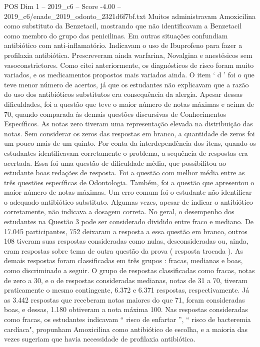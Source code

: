 \begin{textsample}{POS Dim 1 – 2019\_c6 – Score -4.00 – 2019\_c6/enade\_2019\_odonto\_2321d6f7bf.txt}
Muitos administravam Amoxicilina como substituto da Benzetacil, mostrando que não identificavam a Benzetacil como membro do grupo das penicilinas.
Em outras situações confundiam antibiótico com anti-inflamatório.
Indicavam o uso de Ibuprofeno para fazer a profilaxia antibiótica.
Prescreveram ainda warfarina, Novalgina e anestésicos sem vasoconstrictores.
Como citei anteriormente, os diagnósticos de risco foram muito variados, e os medicamentos propostos mais variados ainda.
O item ‘ d ’ foi o que teve menor número de acertos, já que os estudantes não explicavam que a razão do uso dos antibióticos substitutos era consequência da alergia.
Apesar dessas dificuldades, foi a questão que teve o maior número de notas máximas e acima de 70, quando comparada às demais questões discursivas de Conhecimentos Específicos.
As notas zero tiveram uma representação elevada na distribuição das notas.
Sem considerar os zeros das respostas em branco, a quantidade de zeros foi um pouco mais de um quinto.
Por conta da interdependência dos itens, quando os estudantes identificavam corretamente o problema, a sequência de respostas era acertada.
Essa foi uma questão de dificuldade média, que possibilitou ao estudante boas redações de resposta.
Foi a questão com melhor média entre as três questões específicas de Odontologia.
Também, foi a questão que apresentou o maior número de notas máximas.
Um erro comum foi o estudante não identificar o adequado antibiótico substituto.
Algumas vezes, apesar de indicar o antibiótico corretamente, não indicava a dosagem correta.
No geral, o desempenho dos estudantes na Questão 3 pode ser considerado dividido entre fraco e mediano.
De 17.045 participantes, 752 deixaram a resposta a essa questão em branco, outros 108 tiveram suas respostas consideradas como nulas, desconsideradas ou, ainda, eram respostas sobre tema de outra questão da prova ( resposta trocada ).
As demais respostas foram classificadas em três grupos : fracas, medianas e boas, como discriminado a seguir.
O grupo de respostas classificadas como fracas, notas de zero a 30, e o de respostas consideradas medianas, notas de 31 a 70, tiveram praticamente o mesmo contingente, 6.372 e 6.371 respostas, respectivamente.
Já as 3.442 respostas que receberam notas maiores do que 71, foram consideradas boas, e dessas, 1.180 obtiveram a nota máxima 100.
Nas respostas consideradas como fracas, os estudantes indicavam “ risco de enfartar ”, “ risco de bacteremia cardíaca", propunham Amoxicilina como antibiótico de escolha, e a maioria das vezes sugeriam que havia necessidade de profilaxia antibiótica.

\end{textsample}
